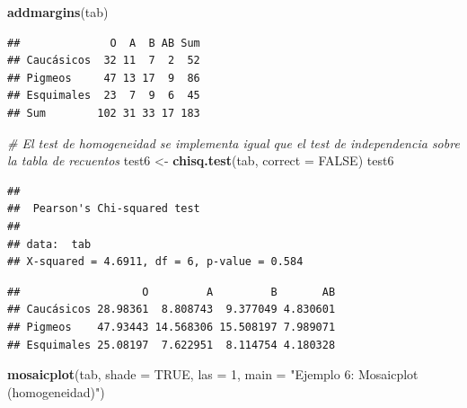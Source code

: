 \documentclass[
]{article}
\newenvironment{Shaded}{\begin{snugshade}}{\end{snugshade}}
\newcommand{\AttributeTok}[1]{\textcolor[rgb]{0.13,0.29,0.53}{#1}}
\newcommand{\CommentTok}[1]{\textcolor[rgb]{0.56,0.35,0.01}{\textit{#1}}}
\newcommand{\ConstantTok}[1]{\textcolor[rgb]{0.56,0.35,0.01}{#1}}
\newcommand{\DecValTok}[1]{\textcolor[rgb]{0.00,0.00,0.81}{#1}}
\newcommand{\FunctionTok}[1]{\textcolor[rgb]{0.13,0.29,0.53}{\textbf{#1}}}
\newcommand{\NormalTok}[1]{#1}
\newcommand{\OtherTok}[1]{\textcolor[rgb]{0.56,0.35,0.01}{#1}}
\newcommand{\SpecialCharTok}[1]{\textcolor[rgb]{0.81,0.36,0.00}{\textbf{#1}}}
\newcommand{\StringTok}[1]{\textcolor[rgb]{0.31,0.60,0.02}{#1}}
\begin{document}
\begin{Shaded}
\begin{Highlighting}[]
\FunctionTok{addmargins}\NormalTok{(tab)}
\end{Highlighting}
\end{Shaded}

\begin{verbatim}
##              O  A  B AB Sum
## Caucásicos  32 11  7  2  52
## Pigmeos     47 13 17  9  86
## Esquimales  23  7  9  6  45
## Sum        102 31 33 17 183
\end{verbatim}

\begin{Shaded}
\begin{Highlighting}[]
\CommentTok{\# El test de homogeneidad se implementa igual que el test de independencia sobre la tabla de recuentos}
\NormalTok{test6 }\OtherTok{\textless{}{-}} \FunctionTok{chisq.test}\NormalTok{(tab, }\AttributeTok{correct =} \ConstantTok{FALSE}\NormalTok{)}
\NormalTok{test6}
\end{Highlighting}
\end{Shaded}

\begin{verbatim}
## 
##  Pearson's Chi-squared test
## 
## data:  tab
## X-squared = 4.6911, df = 6, p-value = 0.584
\end{verbatim}

\begin{Shaded}
\end{Shaded}

\begin{verbatim}
##                   O         A         B       AB
## Caucásicos 28.98361  8.808743  9.377049 4.830601
## Pigmeos    47.93443 14.568306 15.508197 7.989071
## Esquimales 25.08197  7.622951  8.114754 4.180328
\end{verbatim}

\begin{Shaded}
\begin{Highlighting}[]
\FunctionTok{mosaicplot}\NormalTok{(tab, }\AttributeTok{shade =} \ConstantTok{TRUE}\NormalTok{, }\AttributeTok{las =} \DecValTok{1}\NormalTok{,}
           \AttributeTok{main =} \StringTok{"Ejemplo 6: Mosaicplot (homogeneidad)"}\NormalTok{)}
\end{Highlighting}
\end{Shaded}
\end{document}
